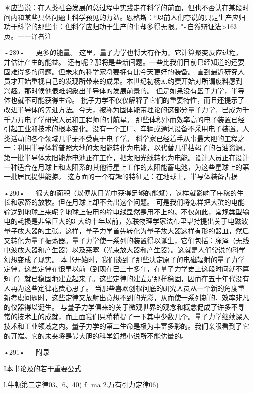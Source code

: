 ＊应当说：在人类社会发展的总过程中实践走在科学的前面，但也不否认在某段时间内和某些具体问题上科学预见的力益。恩格斯：“以前人们夸说的只是生产应归功于科学的那些事：但科学应归功于生产的事却多得无限。"«自然辩证法>163页。一一译者注

•289•
  
更多的能量。
这里，量子力学也将大有作为。它计算聚变反应过程，并估计产生的能益。
还有呢？那将是些新间题。一些比我们目前巳经知道的还要固难得多的问题。但未来的科学家将要拥有比今天更好的装备。
直到最近研究人员才开始重视自己的发现所带来的成果。本世纪初杨A.约费开始对所谓废料感到兴趣。那时候他很难想象出半导体的发展前景的。
但是如果没有篮子力学，半导体也就不可能获得生命。
批子力学不仅仅解释了它们的重要特性，而且还提示了改进半导体的先进方法。今天，被称为固体能带理论的这部分量子力学，巳成为千千万万电子学研究人员和工程师的引航星。
那些体积小而效率高的电子装置已经引起工业和技术的根本变化。没有一个工厂、车辆或通讯设备不采用电子装置。人类活动的各个领域几乎无不受惠于电子学。
科学家已经着手从事最大胆的工程之一：利用半导体将普照大地的太阳能转化为电能，以代替几乎枯竭了的石油资源。第一批半导体太阳能蓄电池正在工作，把太阳光线转化为电能。设计人员正在设计一种适合在月球上和太阳系的其他行星上工作的太阳能蓄电池，为这些星球上的第一批居民提供能掠。
这方面的一个有趣的特征是：在地球上，半导体装备占据

•290•
  
很大的面积（以便从日光中获得足够的能斌），这样就影响了庄稼的生长和家畜的放牧。但在月球上却不会出这个问题。
可是我们将怎样把大蜇的电能输送到地球上来呢？地球上使用的输电线显然是用不上的。不仅如此，常规类型输电的耗损是非常巨大的3
大约十年以前，苏联物理学家法布里堪持提出关于电磁波量子放大器的主张。这样，量子力学首先转化为量子放大器这样有形的器皿，然后又转化为量子振荡器。量子力学使一系列的装置得以诞生，它们包括：脉泽（无线电波放大器和产生器）以及莱塞（光束放大器和产生器）。这就是人们常说的科学幻想变成了现实。
本书开始时，我们谈到了那些决定原子的电磁辐射的量子力学定律。这些定律在很早以前（到现在巳三十多年，在量子力学史上这段时间就不算短了）就已稳固地建立起来了。这些定律的建立是那样稳固，因而在五十年代没有人再为这些定律花费心思了。
当那些喜欢创根问底的研究人员从一个新的角度重新考虑间题时，这些定律又放射出意想不到的光彩，从而使一系列新的、效率非凡的仪器得以诞生。
与量子力学俱来的关于微观世界的观念和概念促成了许多不寻常的技术上的成就，而上面我们只稍稍提了一下其中少数几个。量子力学继续深入技术和工业领域之内。量子力学的第二生命是极为丰富多彩的。我们亲眼看到了它的开端。它的未来将是最大胆的科学幻想小说所不能估量的。

•291•
  
附录

I本书论及的若干重要公式

l.牛顿第二定律03、6、40)
f=ma
2.万有引力定律06)

